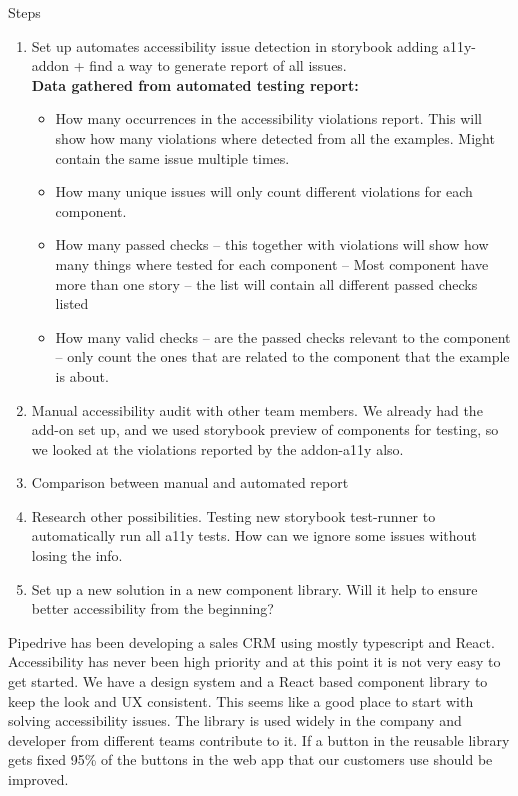 \documentclass{master_thesis}
\begin{document}

Steps
\begin{enumerate}
	\item Set up automates accessibility issue detection in storybook
	adding a11y-addon + find a way to generate report of all issues. \\
	\textbf{Data gathered from automated testing report:}
	\begin{itemize}
		\item How many occurrences in the accessibility violations report. This will show how many violations where detected from all the examples. Might contain the same issue multiple times.
		\item How many unique issues will only count different violations for each component.
		\item How many passed checks – this together with violations will show how many things where tested for each component – Most component have more than one story – the list will contain all different passed checks listed
		\item How many valid checks – are the passed checks relevant to the component – only count the ones that are related to the component that the example is about.
	\end{itemize}
	\item Manual accessibility audit with other team members. We already had the add-on set up, and we used storybook preview of components for testing, so we looked at the violations reported by the addon-a11y also.
	\item Comparison between manual and automated report
	\item Research other possibilities. Testing new storybook test-runner to automatically run all a11y tests. How can we ignore some issues without losing the info.
	\item Set up a new solution in a new component library. Will it help to ensure better accessibility from the beginning?
\end{enumerate}

Pipedrive has been developing a sales CRM using mostly typescript and React. Accessibility has never been high priority and at this point it is not very easy to get started. We have a design system and a React based component library to keep the look and UX consistent. This seems like a good place to start with solving accessibility issues. The library is used widely in the company and developer from different teams contribute to it. If a button in the reusable library gets fixed 95\% of the buttons in the web app that our customers use should be improved.
\end{document}
